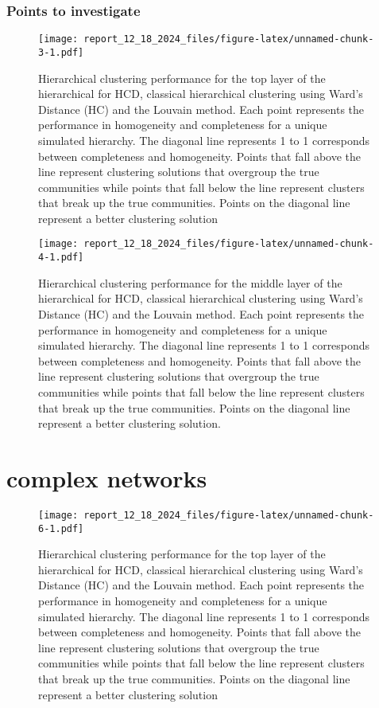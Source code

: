 \documentclass[
]{article}
\begin{document}
\subsubsection{Points to investigate}\label{points-to-investigate}

\begin{figure}
\centering
\texttt{[image: report\_12\_18\_2024\_files/figure-latex/unnamed-chunk-3-1.pdf]}
\caption{Hierarchical clustering performance for the top layer of the
hierarchical for HCD, classical hierarchical clustering using Ward's
Distance (HC) and the Louvain method. Each point represents the
performance in homogeneity and completeness for a unique simulated
hierarchy. The diagonal line represents 1 to 1 corresponds between
completeness and homogeneity. Points that fall above the line represent
clustering solutions that overgroup the true communities while points
that fall below the line represent clusters that break up the true
communities. Points on the diagonal line represent a better clustering
solution}
\end{figure}

\begin{figure}
\centering
\texttt{[image: report\_12\_18\_2024\_files/figure-latex/unnamed-chunk-4-1.pdf]}
\caption{Hierarchical clustering performance for the middle layer of the
hierarchical for HCD, classical hierarchical clustering using Ward's
Distance (HC) and the Louvain method. Each point represents the
performance in homogeneity and completeness for a unique simulated
hierarchy. The diagonal line represents 1 to 1 corresponds between
completeness and homogeneity. Points that fall above the line represent
clustering solutions that overgroup the true communities while points
that fall below the line represent clusters that break up the true
communities. Points on the diagonal line represent a better clustering
solution.}
\end{figure}

\section{complex networks}\label{complex-networks}

\begin{figure}
\centering
\texttt{[image: report\_12\_18\_2024\_files/figure-latex/unnamed-chunk-6-1.pdf]}
\caption{Hierarchical clustering performance for the top layer of the
hierarchical for HCD, classical hierarchical clustering using Ward's
Distance (HC) and the Louvain method. Each point represents the
performance in homogeneity and completeness for a unique simulated
hierarchy. The diagonal line represents 1 to 1 corresponds between
completeness and homogeneity. Points that fall above the line represent
clustering solutions that overgroup the true communities while points
that fall below the line represent clusters that break up the true
communities. Points on the diagonal line represent a better clustering
solution}
\end{figure}
\end{document}
